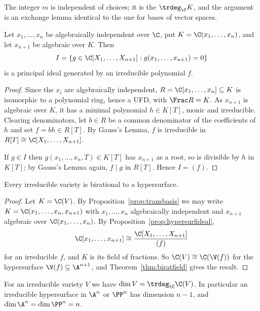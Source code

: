 The integer $m$ is independent of choices; it is the  $\trdeg_\C K$, and the argument is an exchange lemma identical to the one for bases of vector spaces.

\begin{proposition}\label{prop:hypersurfideal}
	Let $x_1,\dots,x_n$ be algebraically independent over $\C$, put $K = \C(x_1,\dots,x_n)$, and let $x_{n+1}$ be algebraic over $K$. Then
	$$I = \{g \in \C[X_1,\dots,X_{n+1}] : g(x_1,\dots,x_{n+1}) = 0\}$$
	is a principal ideal generated by an irreducible polynomial $f$.
\end{proposition}

\begin{proof}
	Since the $x_i$ are algebraically independent, $R = \C[x_1,\dots,x_n] \subseteq K$ is isomorphic to a polynomial ring, hence a UFD, with $\Frac R = K$. As $x_{n+1}$ is algebraic over $K$, it has a minimal polynomial $h \in K[T]$, monic and irreducible. Clearing denominators, let $b \in R$ be a common denominator of the coefficients of $h$ and set $f = bh \in R[T]$. By Gauss's Lemma, $f$ is irreducible in $R[T] \cong \C[X_1,\dots,X_{n+1}]$.

	If $g \in I$ then $g(x_1,\dots,x_n,T) \in K[T]$ has $x_{n+1}$ as a root, so is divisible by $h$ in $K[T]$; by Gauss's Lemma again, $f \mid g$ in $R[T]$. Hence $I = (f)$.
\end{proof}

\begin{corollary}\label{cor:birathyp}
	Every irreducible variety is birational to a hypersurface.
\end{corollary}

\begin{proof}
	Let $K = \C(V)$. By Proposition~\ref{prop:transbasis} we may write $K = \C(x_1,\dots,x_n,x_{n+1})$ with $x_1,\dots,x_n$ algebraically independent and $x_{n+1}$ algebraic over $\C(x_1,\dots,x_n)$. By Proposition~\ref{prop:hypersurfideal},
	$$\C[x_1,\dots,x_{n+1}] \cong \frac{\C[X_1,\dots,X_{n+1}]}{(f)}$$
	for an irreducible $f$, and $K$ is its field of fractions. So $\C(V) \cong \C(\V(f))$ for the hypersurface $\V(f) \subseteq \A^{n+1}$, and Theorem~\ref{thm:biratfield} gives the result.
\end{proof}

\begin{corollary}\label{cor:dimtrdeg}
	For an irreducible variety $V$ we have $\dim V = \trdeg_\C \C(V)$. In particular an irreducible hypersurface in $\A^n$ or $\PP^n$ has dimension $n-1$, and $\dim \A^n = \dim\PP^n = n$.
\end{corollary}

